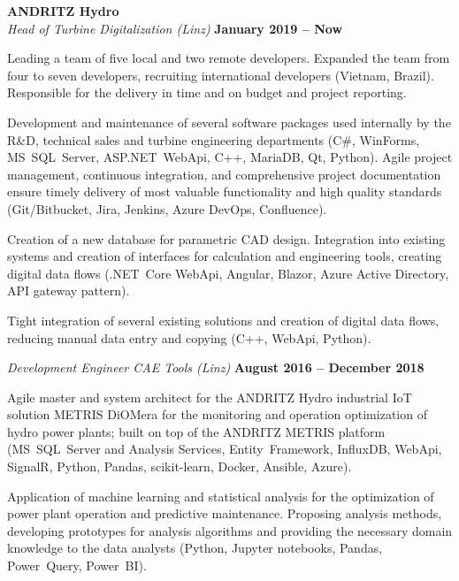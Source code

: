 \documentclass[line,11pt,a4paper]{resume}
\begin{document}
\begin{resume}
\textbf{ANDRITZ Hydro}\\\vspace{1mm}%
\textsl{Head of Turbine Digitalization (Linz)}
  \hfill \textbf{January 2019 -- Now}\\
\vspace{-4mm}%
\begin{list2}
  \item Leading a team of five local and two remote developers. Expanded the
    team from four to seven developers, recruiting international developers
    (Vietnam, Brazil). Responsible for the delivery in time and on budget and
    project reporting.
  \item Development and maintenance of several software packages used
    internally by the R\&D, technical sales and turbine engineering
    departments (C\#, WinForms, MS~SQL~Server, ASP.NET~WebApi, C++, MariaDB,
    Qt, Python). Agile project management, continuous integration, and
    comprehensive project documentation ensure timely delivery of most valuable
    functionality and high quality standards (Git/Bitbucket, Jira, Jenkins,
    Azure DevOps, Confluence).
  \item Creation of a new database for parametric CAD design. Integration into
    existing systems and creation of interfaces for calculation and engineering
    tools, creating digital data flows (.NET~Core WebApi, Angular, Blazor,
    Azure Active Directory, API gateway pattern).
  \item Tight integration of several existing solutions and creation of digital
    data flows, reducing manual data entry and copying (C++, WebApi, Python).
\end{list2}

\textsl{Development Engineer CAE Tools (Linz)}
  \hfill \textbf{August 2016 -- December 2018}\\
\vspace{-4mm}%
\begin{list2}
  \item Agile master and system architect for the ANDRITZ Hydro industrial IoT
    solution METRIS DiOMera for the monitoring and operation optimization of
    hydro power plants; built on top of the ANDRITZ METRIS platform
    (MS~SQL~Server and Analysis Services, Entity~Framework, InfluxDB, WebApi,
    SignalR, Python, Pandas, scikit-learn, Docker, Ansible, Azure).
  \item Application of machine learning and statistical analysis for the
    optimization of power plant operation and predictive maintenance.
    Proposing analysis methods, developing prototypes for analysis algorithms
    and providing the necessary domain knowledge to the data analysts (Python,
    Jupyter notebooks, Pandas, Power~Query, Power~BI).
\end{list2}


\end{resume}
\end{document}
